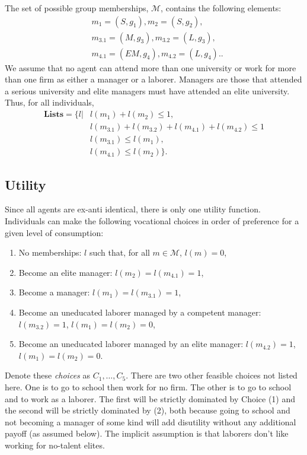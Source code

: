\documentclass[12pt,letterpaper]{article}
\begin{document}
	The set of possible group memberships, $\mathcal{M}$, contains the following elements:
	\begin{align*}
		&m_1=(S,g_1),m_2=(S,g_2),\\
		&m_{3.1}=(M,g_3),m_{3.2}=(L,g_3),\\
		&m_{4.1}=(EM,g_4),m_{4.2}=(L,g_4).
		.
	\end{align*}
	We assume that no agent can attend more than one university or work for more than one firm as either a manager or a laborer.
	Managers are those that attended a serious university and elite managers must have attended an elite university. 
	Thus, for all individuals,
	\begin{align*}
		\textbf{Lists}=\Big\{l|
		&l(m_1)+l(m_2)\le1,\\
		&l(m_{3.1})+l(m_{3.2})+l(m_{4.1})+l(m_{4.2})\le1\\
		&l(m_{3.1})\le l(m_1),\\
		&l(m_{4.1})\le l(m_2)\Big\}.
	\end{align*}
	
	\subsection{Utility}
	Since all agents are ex-anti identical, there is only one utility function.
	Individuals can make the following vocational choices in order of preference for a given level of consumption:
	\begin{enumerate}
		\item No memberships: $l$ such that, for all $m\in\mathcal{M}$, $l(m)=0$,
		\item Become an elite manager: $l(m_2)=l(m_{4.1})=1$,
		\item Become a manager: $l(m_1)=l(m_{3.1})=1$,
		\item Become an uneducated laborer managed by a competent manager: $l(m_{3.2})=1$, $l(m_1)=l(m_2)=0$,
		\item Become an uneducated laborer managed by an elite manager: $l(m_{4.2})=1$, $l(m_1)=l(m_2)=0$.
	\end{enumerate}
	Denote these \textit{choices} as $C_1,\ldots,C_5$.
	There are two other feasible choices not listed here. 
	One is to go to school then work for no firm. 
	The other is to go to school and to work as a laborer. 
	The first will be strictly dominated by Choice (1) and the second will be strictly dominated by (2), both because going to school and not becoming a manager of some kind will add disutility without any additional payoff (as assumed below).
	The implicit assumption is that laborers don't like working for no-talent elites. 
	
\end{document}
